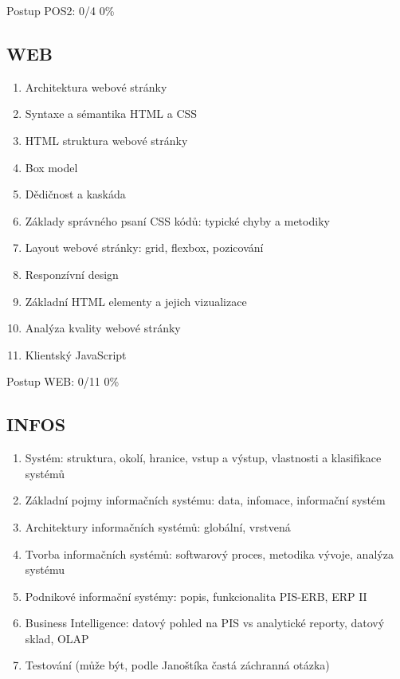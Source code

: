 \documentclass{article}
\begin{document}
	Postup POS2: 0/4 0\%
	
	\subsection*{WEB}
	
	\begin{enumerate}[label=\arabic*.]
		\item Architektura webové stránky
		\item Syntaxe a sémantika HTML a CSS
		\item HTML struktura webové stránky
		\item Box model
		\item Dědičnost a kaskáda
		\item Základy správného psaní CSS kódů: typické chyby a metodiky
		\item Layout webové stránky: grid, flexbox, pozicování
		\item Responzívní design
		\item Základní HTML elementy a jejich vizualizace
		\item Analýza kvality webové stránky
		\item Klientský JavaScript
	\end{enumerate}
	
	Postup WEB: 0/11 0\%
	
	\subsection*{INFOS}
	
	\begin{enumerate}[label=\arabic*.]
		\item Systém: struktura, okolí, hranice, vstup a výstup, vlastnosti a klasifikace systémů
		\item Základní pojmy informačních systému: data, infomace, informační systém
		\item Architektury informačních systémů: globální, vrstvená
		\item Tvorba informačních systémů: softwarový proces, metodika vývoje, analýza systému
		\item Podnikové informační systémy: popis, funkcionalita PIS-ERB, ERP II
		\item Business Intelligence: datový pohled na PIS vs analytické reporty, datový sklad, OLAP
		\item Testování (může být, podle Janoštíka častá záchranná otázka)
	\end{enumerate}
	
\end{document}

